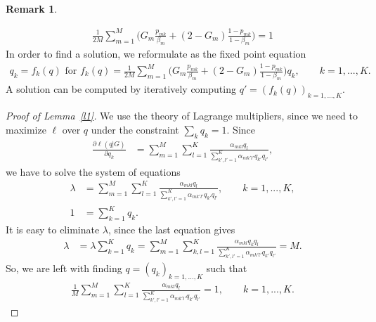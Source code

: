 \documentclass[12pt]{article}
\theoremstyle{definition}
\newtheorem{remark}{Remark}[section]
\begin{document}
\begin{remark}
\begin{enumerate}
\begin{align*}
      \frac{1}{2M} \sum_{m=1}^M \Big(G_m \frac{p_{mk}}{\beta_m} + (2-G_m)\frac{1-p_{mk}}{1-\beta_m}\Big) = 1
    \end{align*}
    In order to find a solution, we reformulate as the fixed point
    equation
    \begin{align}\label{eqSI:fixed}
      q_k = f_k(q) \text{ for }f_k(q) =
      \frac{1}{2M} \sum_{m=1}^M \Big(G_m \frac{p_{mk}}{\beta_m} + (2-G_m)\frac{1-p_{mk}}{1-\beta_m}\Big)q_k,
      \qquad k =1,...,K.
    \end{align}
    A solution can be computed by iteratively computing
    $q' = (f_k(q))_{k=1,...,K}$.
  \end{enumerate}
\end{remark}

\begin{proof}[Proof of Lemma~\ref{l1}]
  We use the theory of Lagrange multipliers, since we need to maximize
  $\ell$ over $q$ under the constraint $\sum_k q_k=1$.  Since
  \begin{align*}
    \frac{\partial \ell(q|G)}{\partial q_k} & = \sum_{m=1}^M \sum_{l=1}^K \frac{\alpha_{mkl}q_l}{\sum_{k',l'=1}^K
                                              \alpha_{mk'l'}q_{k'}q_{l'}},
  \end{align*}
  we have to solve the system of equations
  \begin{align*}
    \lambda & = \sum_{m=1}^M \sum_{l=1}^K \frac{\alpha_{mkl}q_l}{\sum_{k',l'=1}^K \alpha_{mk'l'}q_{k'}q_{l'}}, \qquad k=1,...,K,
    \\
    1 & = \sum_{k=1}^K q_k.
  \end{align*}
  It is easy to eliminate $\lambda$, since the last equation gives
  \begin{align*}
    \lambda & = \lambda \sum_{k=1}^K q_k = \sum_{m=1}^M \sum_{k,l=1}^K
              \frac{\alpha_{mkl}q_kq_l}{\sum_{k',l'=1}^K \alpha_{mk'l'}q_{k'}q_{l'}} = M.
  \end{align*}
  So, we are left with finding $q = (q_k)_{k=1,...,K}$ such that
  \begin{align*}
    \frac{1}{M}\sum_{m=1}^M \sum_{l=1}^K \frac{\alpha_{mkl}q_l}{\sum_{k',l'=1}^K \alpha_{mk'l'}q_{k'}q_{l'}} = 1, \qquad k=1,...,K.
  \end{align*}
\end{proof}
\end{document}

